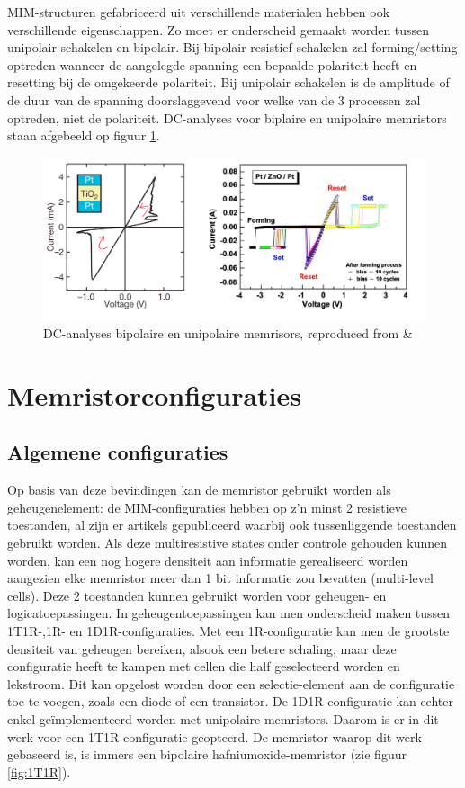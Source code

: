 MIM-structuren gefabriceerd uit verschillende materialen hebben ook verschillende eigenschappen. Zo moet er onderscheid gemaakt worden tussen unipolair schakelen en bipolair. Bij bipolair resistief schakelen zal forming/setting optreden wanneer de aangelegde spanning een bepaalde polariteit heeft en resetting bij de omgekeerde polariteit. Bij unipolair schakelen is de amplitude of de duur van de spanning doorslaggevend voor welke van de 3 processen zal optreden, niet de polariteit. DC-analyses voor biplaire en unipolaire memristors staan afgebeeld op figuur \ref{fig:bipolar-unipolar}.

\begin{figure}
  \centering
  \includegraphics[scale=0.27]{../fig/hfdstk-cel-bipolar-unipolar.png}
  \caption[DC-analyse bipolaire/unipolaire memristor]{DC-analyses bipolaire en unipolaire memrisors, reproduced from \cite{Str08} \& \cite{Cha08}}
  \label{fig:bipolar-unipolar}
\end{figure}


\section{Memristorconfiguraties}

\subsection{Algemene configuraties}
Op basis van deze bevindingen kan de memristor gebruikt worden als geheugenelement: de MIM-configuraties hebben op z'n minst 2 resistieve toestanden, al zijn er artikels gepubliceerd waarbij ook tussenliggende toestanden gebruikt worden\cite{Liu12}. Als deze multiresistive states onder controle gehouden kunnen worden, kan een nog hogere densiteit aan informatie gerealiseerd worden aangezien elke memristor meer dan 1 bit informatie zou bevatten (multi-level cells).
Deze 2 toestanden kunnen gebruikt worden voor geheugen- en logicatoepassingen\cite{ros12}\cite{raj09}. In geheugentoepassingen kan men onderscheid maken tussen 1T1R-,1R- en 1D1R-configuraties\cite{Den13}. Met een 1R-configuratie kan men de grootste densiteit van geheugen bereiken, alsook een betere schaling, maar deze configuratie heeft te kampen met cellen die half geselecteerd worden en lekstroom. Dit kan opgelost worden door een selectie-element aan de configuratie toe te voegen, zoals een diode of een transistor. De 1D1R configuratie kan echter enkel geïmplementeerd worden met unipolaire memristors\cite{Wou09}. Daarom is er in dit werk voor een 1T1R-configuratie geopteerd. De memristor waarop dit werk gebaseerd is, is immers een bipolaire hafniumoxide-memristor (zie figuur \ref{fig:1T1R}).

